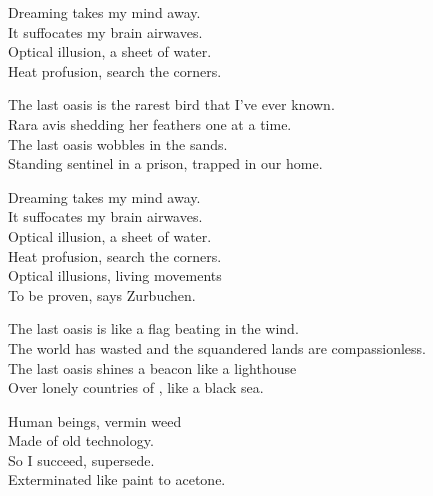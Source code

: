 
Dreaming takes my mind away. \\
It suffocates my brain airwaves. \\

Optical illusion, a sheet of water. \\
Heat profusion, search the corners. \\


The last oasis is the rarest bird that I've ever known. \\
Rara avis shedding her feathers one at a time. \\
The last oasis wobbles in the  sands. \\
Standing sentinel in a prison, trapped in our home. \\


Dreaming takes my mind away. \\
It suffocates my brain airwaves. \\

Optical illusion, a sheet of water. \\
Heat profusion, search the corners. \\

Optical illusions, living movements \\
To be proven, says Zurbuchen. \\


The last oasis is like a flag beating in the wind. \\
The world has wasted and the squandered lands are compassionless. \\
The last oasis shines a beacon like a lighthouse \\
Over lonely countries of , like a black sea. \\





Human beings, vermin weed \\
Made of old technology. \\
So I succeed, supersede. \\
Exterminated like paint to acetone. \\

